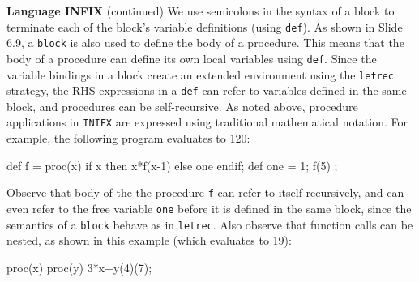 \begin{minipage}[t]{\sw}
\slidenumber
\LARGE
{\bf Language INFIX} (continued)\exx
We use semicolons in the syntax of a block to terminate
each of the block's variable definitions (using \verb'def').
As shown in Slide 6.9, 
a \verb'block' is also used to define the body of a procedure.
This means that the body of a procedure can define its own
local variables using \verb'def'.
Since the variable bindings in a block create an extended environment
using the \verb'letrec' strategy,
the RHS expressions in a \verb'def'
can refer to variables defined in the same block,
and procedures can be self-recursive.\exx
As noted above, procedure applications in \verb'INIFX' are expressed
using traditional mathematical notation.
For example, 
the following program evaluates to 120:
{\Large
\begin{qv}
{ def f = proc(x) {if x then x*f(x-1) else one endif};
  def one = 1;
  f(5)
} ;
\end{qv}
}
Observe that body of the the procedure \verb'f' can refer
to itself recursively,
and can even refer to the free variable \verb'one'
before it is defined in the same block,
since the semantics of a \verb'block'
behave as in \verb'letrec'.\exx
Also observe that function calls can be nested, as shown in this example
(which evaluates to 19):
{\Large
\begin{qv}
proc(x) {proc(y) {3*x+y}}(4)(7);
\end{qv}
}
\end{minipage}
